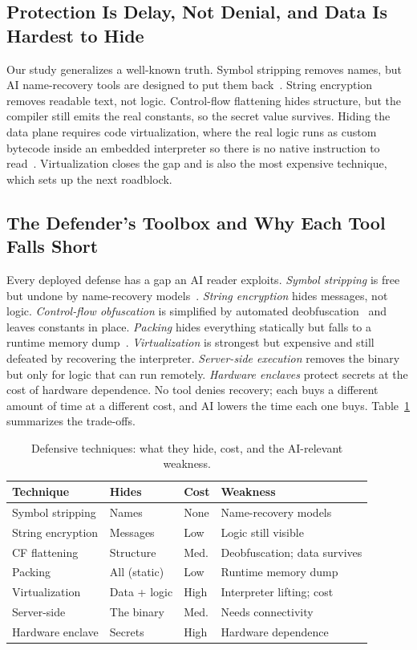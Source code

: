 \documentclass[conference]{IEEEtran}
\begin{document}
\subsection{Protection Is Delay, Not Denial, and Data Is Hardest to Hide}
Our study generalizes a well-known truth. Symbol stripping removes names, but AI
name-recovery tools are designed to put them back~\cite{gennm,funcname,howfar}.
String encryption removes readable text, not logic. Control-flow flattening hides
structure, but the compiler still emits the real constants, so the secret value
survives. Hiding the data plane requires code virtualization, where the real logic
runs as custom bytecode inside an embedded interpreter so there is no native
instruction to read~\cite{protecting-survey}. Virtualization closes the gap and is
also the most expensive technique, which sets up the next roadblock.

\subsection{The Defender's Toolbox and Why Each Tool Falls Short}
Every deployed defense has a gap an AI reader exploits. \emph{Symbol stripping} is
free but undone by name-recovery models~\cite{gennm,funcname}. \emph{String
encryption} hides messages, not logic. \emph{Control-flow obfuscation} is simplified
by automated deobfuscation~\cite{angr,udupa} and leaves constants in place.
\emph{Packing} hides everything statically but falls to a runtime memory
dump~\cite{rolles}. \emph{Virtualization} is strongest but expensive and still
defeated by recovering the interpreter. \emph{Server-side execution} removes the
binary but only for logic that can run remotely. \emph{Hardware enclaves} protect
secrets at the cost of hardware dependence. No tool denies recovery; each buys a
different amount of time at a different cost, and AI lowers the time each one buys.
Table~\ref{tab:mitig} summarizes the trade-offs.

\begin{table}[t]
\caption{Defensive techniques: what they hide, cost, and the AI-relevant weakness.}
\label{tab:mitig}
\centering\footnotesize
\begin{tabular}{@{}p{1.5cm}p{1.6cm}p{0.8cm}p{2.3cm}@{}}
\toprule
\textbf{Technique} & \textbf{Hides} & \textbf{Cost} & \textbf{Weakness} \\
\midrule
Symbol stripping & Names & None & Name-recovery models \\
String encryption & Messages & Low & Logic still visible \\
CF flattening & Structure & Med. & Deobfuscation; data survives \\
Packing & All (static) & Low & Runtime memory dump \\
Virtualization & Data + logic & High & Interpreter lifting; cost \\
Server-side & The binary & Med. & Needs connectivity \\
Hardware enclave & Secrets & High & Hardware dependence \\
\bottomrule
\end{tabular}
\end{table}
\end{document}
